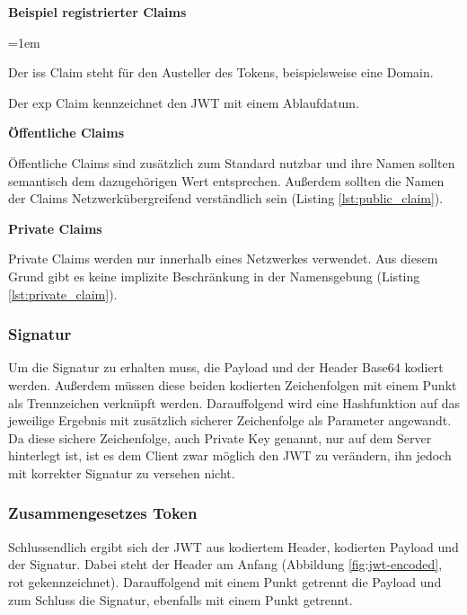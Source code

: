 \noindent
\textbf{Beispiel registrierter Claims}

\begin{description}
	\leftskip=1em
	\item[iss]
	Der iss Claim steht für den Austeller des Tokens, beispielsweise eine Domain.
	\item[exp] Der exp Claim kennzeichnet den \gls{JWT} mit einem Ablaufdatum.
\end{description}

\noindent
\textbf{Öffentliche Claims}

Öffentliche Claims sind zusätzlich zum Standard nutzbar und ihre Namen sollten semantisch dem dazugehörigen Wert entsprechen. Au{\ss}erdem sollten die Namen der Claims Netzwerkübergreifend verständlich sein (Listing \ref{lst:public_claim}).

\noindent
\textbf{Private Claims}

Private Claims werden nur innerhalb eines Netzwerkes verwendet. Aus diesem Grund gibt es keine implizite Beschränkung in der Namensgebung (Listing \ref{lst:private_claim}).

\begin{minipage}{\linewidth}
	

	
\end{minipage}

\subsubsection{Signatur}
\label{sec: jwt_signature}

Um die Signatur zu erhalten muss, die Payload und der Header Base64 kodiert werden. Au{\ss}erdem müssen diese beiden kodierten Zeichenfolgen mit einem Punkt als Trennzeichen verknüpft werden. Darauffolgend wird eine Hashfunktion auf das jeweilige Ergebnis mit zusätzlich sicherer Zeichenfolge als Parameter angewandt. Da diese sichere Zeichenfolge, auch Private Key genannt, nur auf dem Server hinterlegt ist, ist es dem Client zwar möglich den \gls{JWT} zu verändern, ihn jedoch mit korrekter Signatur zu versehen nicht.

\subsubsection{Zusammengesetzes Token}
\label{sec: jwt_result}
Schlussendlich ergibt sich der \gls{JWT} aus kodiertem Header, kodierten Payload und der Signatur. Dabei steht der Header am Anfang (Abbildung \ref{fig:jwt-encoded}, rot gekennzeichnet). Darauffolgend mit einem Punkt getrennt die Payload und zum Schluss die Signatur, ebenfalls mit einem Punkt getrennt.

